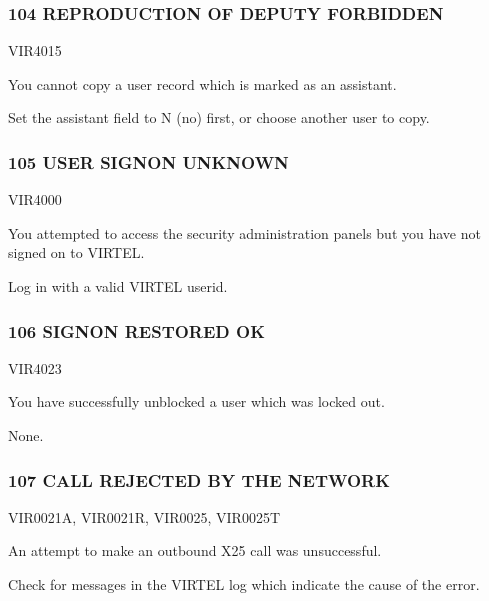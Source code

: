 \documentclass[letterpaper,10pt,english]{sphinxmanual}
\begin{document}
\subsubsection{104 REPRODUCTION OF DEPUTY FORBIDDEN}
\label{\detokenize{messages:reproduction-of-deputy-forbidden}}\begin{description}
\sphinxAtStartPar
VIR4015

\sphinxAtStartPar
You cannot copy a user record which is marked as an assistant.

\sphinxAtStartPar
Set the assistant field to N (no) first, or choose another user to copy.

\end{description}


\subsubsection{105 USER SIGN\sphinxhyphen{}ON UNKNOWN}
\label{\detokenize{messages:user-sign-on-unknown}}\begin{description}
\sphinxAtStartPar
VIR4000

\sphinxAtStartPar
You attempted to access the security administration panels but you have not signed on to VIRTEL.

\sphinxAtStartPar
Log in with a valid VIRTEL userid.

\end{description}


\subsubsection{106 SIGN\sphinxhyphen{}ON RESTORED OK}
\label{\detokenize{messages:sign-on-restored-ok}}\begin{description}
\sphinxAtStartPar
VIR4023

\sphinxAtStartPar
You have successfully unblocked a user which was locked out.

\sphinxAtStartPar
None.

\end{description}


\subsubsection{107 CALL REJECTED BY THE NETWORK}
\label{\detokenize{messages:call-rejected-by-the-network}}\begin{description}
\sphinxAtStartPar
VIR0021A, VIR0021R, VIR0025, VIR0025T

\sphinxAtStartPar
An attempt to make an outbound X25 call was unsuccessful.

\sphinxAtStartPar
Check for messages in the VIRTEL log which indicate the cause of the error.

\end{description}
\end{document}
